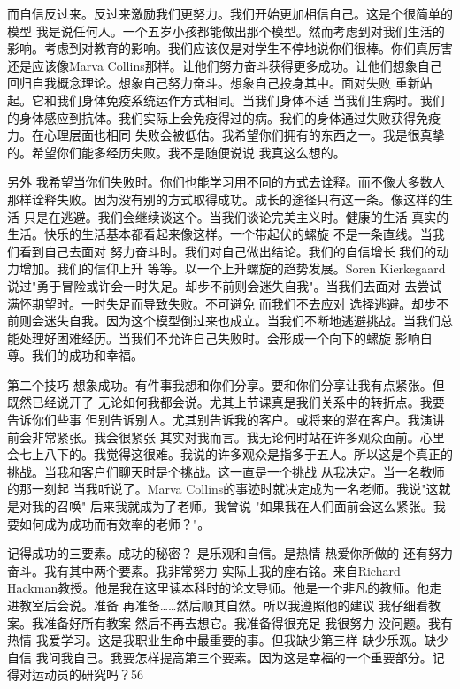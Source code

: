 而自信反过来。反过来激励我们更努力。我们开始更加相信自己。这是个很简单的模型 我是说任何人。一个五岁小孩都能做出那个模型。然而考虑到对我们生活的影响。考虑到对教育的影响。我们应该仅是对学生不停地说你们很棒。你们真厉害 还是应该像Marva Collins那样。让他们努力奋斗获得更多成功。让他们想象自己回归自我概念理论。想象自己努力奋斗。想象自己投身其中。面对失败 重新站起。它和我们身体免疫系统运作方式相同。当我们身体不适 当我们生病时。我们的身体感应到抗体。我们实际上会免疫得过的病。我们的身体通过失败获得免疫力。在心理层面也相同 失败会被低估。我希望你们拥有的东西之一。我是很真挚的。希望你们能多经历失败。我不是随便说说 我真这么想的。 

另外 我希望当你们失败时。你们也能学习用不同的方式去诠释。而不像大多数人那样诠释失败。因为没有别的方式取得成功。成长的途径只有这一条。像这样的生活 只是在逃避。我们会继续谈这个。当我们谈论完美主义时。健康的生活 真实的生活。快乐的生活基本都看起来像这样。一个带起伏的螺旋 不是一条直线。当我们看到自己去面对 努力奋斗时。我们对自己做出结论。我们的自信增长 我们的动力增加。我们的信仰上升 等等。以一个上升螺旋的趋势发展。Soren Kierkegaard说过"勇于冒险或许会一时失足。却步不前则会迷失自我"。当我们去面对 去尝试 满怀期望时。一时失足而导致失败。不可避免 而我们不去应对 选择逃避。却步不前则会迷失自我。因为这个模型倒过来也成立。当我们不断地逃避挑战。当我们总能处理好困难经历。当我们不允许自己失败时。会形成一个向下的螺旋 影响自尊。我们的成功和幸福。 

第二个技巧 想象成功。有件事我想和你们分享。要和你们分享让我有点紧张。但既然已经说开了 无论如何我都会说。尤其上节课真是我们关系中的转折点。我要告诉你们些事 但别告诉别人。尤其别告诉我的客户。或将来的潜在客户。我演讲前会非常紧张。我会很紧张 其实对我而言。我无论何时站在许多观众面前。心里会七上八下的。我觉得这很难。我说的许多观众是指多于五人。所以这是个真正的挑战。当我和客户们聊天时是个挑战。这一直是一个挑战 从我决定。当一名教师的那一刻起 当我听说了。Marva Collins的事迹时就决定成为一名老师。我说"这就是对我的召唤" 后来我就成为了老师。我曾说 "如果我在人们面前会这么紧张。我要如何成为成功而有效率的老师？"。 

记得成功的三要素。成功的秘密？ 是乐观和自信。是热情 热爱你所做的 还有努力奋斗。我有其中两个要素。我非常努力 实际上我的座右铭。来自Richard Hackman教授。他是我在这里读本科时的论文导师。他是一个非凡的教师。他走进教室后会说。准备 再准备……然后顺其自然。所以我遵照他的建议 我仔细看教案。我准备好所有教案 然后不再去想它。我准备得很充足 我很努力 没问题。我有热情 我爱学习。这是我职业生命中最重要的事。但我缺少第三样 缺少乐观。缺少自信 我问我自己。我要怎样提高第三个要素。因为这是幸福的一个重要部分。记得对运动员的研究吗？56%

